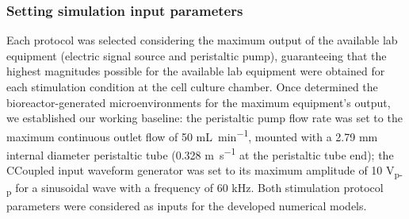 \subsubsection{Setting simulation input parameters}
Each protocol was selected considering the maximum output of the available lab equipment (electric signal source and peristaltic pump), guaranteeing that the highest magnitudes possible for the available lab equipment were obtained for each stimulation condition at the cell culture chamber. Once determined the bioreactor-generated microenvironments for the maximum equipment's output, we established our working baseline: the peristaltic pump flow rate was set to the maximum continuous outlet flow of 50 \unit{\milli\liter\per\minute}, mounted with a 2.79 \unit{\milli\meter} internal diameter peristaltic tube (0.328 \si{\meter\per\second} at the peristaltic tube end); the CCoupled input waveform generator was set to its maximum amplitude of 10 \si{\volt}\textsubscript{p-p} for a sinusoidal wave with a frequency of 60 \unit{\kilo\hertz}. Both stimulation protocol parameters were considered as inputs for the developed numerical models.


